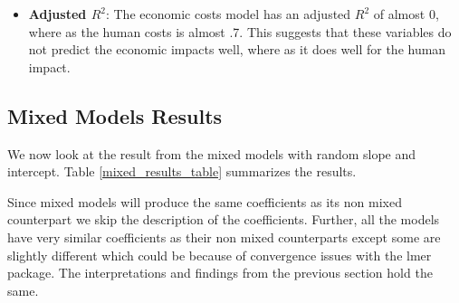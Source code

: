 \begin{itemize}
	\item \textbf{Adjusted $R^2$}: The economic costs model has an adjusted $R^2$ of almost 0, where as the human costs is almost .7. This suggests that these variables do not predict the economic impacts well, where as it does well for the human impact. 
\end{itemize}


\subsection{Mixed Models Results}
We now look at the result from the mixed models with random slope and intercept. Table \ref{mixed_results_table} summarizes the results.

Since mixed models will produce the same coefficients as its non mixed counterpart we skip the description of the coefficients. Further, all the models have very similar coefficients as their non mixed counterparts except some are slightly different which could be because of convergence issues with the lmer package. The interpretations and findings from the previous section hold the same.